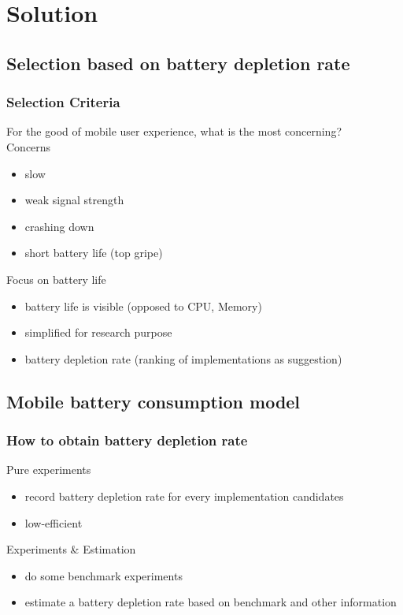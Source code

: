 \documentclass{beamer}
\begin{document}
\section{Solution}
\subsection{Selection based on battery depletion rate}
\begin{frame}
\frametitle{Selection Criteria}
For the good of mobile user experience, what is the most concerning?\\
\vspace{0.3cm}
\pause
Concerns
\begin{itemize}
\item slow
\item weak signal strength
\item crashing down
\item short battery life (top gripe)
\end{itemize}
\vspace{0.3cm}
\pause
Focus on battery life
\begin{itemize}
\item battery life is visible (opposed to CPU, Memory)
\item simplified for research purpose
\item battery depletion rate (ranking of implementations as suggestion)
\end{itemize}
\end{frame}

\subsection{Mobile battery consumption model}

\begin{frame}
\frametitle{How to obtain battery depletion rate}
Pure experiments
\begin{itemize}
\item record battery depletion rate for every implementation candidates
\item low-efficient
\end{itemize}
\vspace{0.3cm}
\pause
Experiments \& Estimation
\begin{itemize}
\item do some benchmark experiments
\item estimate a battery depletion rate based on benchmark and other information
\end{itemize}
\end{frame}
\end{document}
